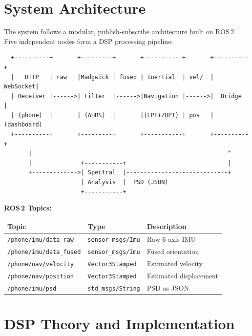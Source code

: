 \documentclass[12pt,a4paper]{article}
\begin{document}
\section{System Architecture}

The system follows a modular, publish-subscribe architecture built on ROS\,2. Five independent nodes form a DSP processing pipeline:

\begin{verbatim}
  +----------+       +---------+       +-----------+       +----------+
  |   HTTP   | raw   |Madgwick | fused | Inertial  | vel/  | WebSocket|
  | Receiver |------>| Filter  |------>|Navigation |------>|  Bridge  |
  | (phone)  |       | (AHRS)  |       |(LPF+ZUPT) | pos   |(dashboard)
  +----------+       +---------+       +-----------+       +----------+
       |                                                        ^
       |              +-----------+                             |
       +------------->| Spectral  |-----------------------------+
                      | Analysis  |  PSD (JSON)
                      +-----------+
\end{verbatim}

\bigskip
\noindent\textbf{ROS\,2 Topics:}
\begin{center}
\begin{tabular}{|l|l|l|}
\hline
\textbf{Topic} & \textbf{Type} & \textbf{Description} \\
\hline
\texttt{/phone/imu/data\_raw}   & \texttt{sensor\_msgs/Imu}    & Raw 6-axis IMU \\
\hline
\texttt{/phone/imu/data\_fused} & \texttt{sensor\_msgs/Imu}    & Fused orientation \\
\hline
\texttt{/phone/nav/velocity}    & \texttt{Vector3Stamped}      & Estimated velocity \\
\hline
\texttt{/phone/nav/position}    & \texttt{Vector3Stamped}      & Estimated displacement \\
\hline
\texttt{/phone/imu/psd}         & \texttt{std\_msgs/String}    & PSD as JSON \\
\hline
\end{tabular}
\end{center}

\section{DSP Theory and Implementation}
\end{document}

